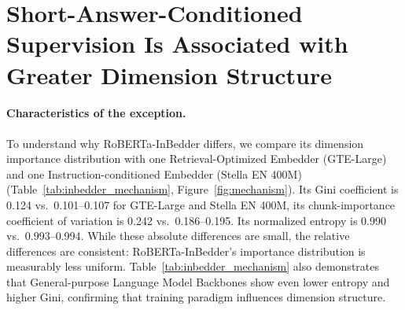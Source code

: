 \documentclass[11pt]{article}
\begin{document}
\begin{table}[t]
    \centering
    \caption{Retrieval cost--quality tradeoff at dim=256 for GTE-Large using FAISS FlatIP. nDCG@10 and Recall report retention relative to the full-dimensional baseline for each task.}
    \label{tab:retrieval_cost}
\end{table}


\section{Short-Answer-Conditioned Supervision Is Associated with Greater Dimension Structure}
\label{sec:Inbedder-mechanism}
\paragraph{Characteristics of the exception.}
To understand why RoBERTa-InBedder differs, we compare its dimension importance distribution with one Retrieval-Optimized Embedder (GTE-Large) and one Instruction-conditioned Embedder (Stella EN 400M) (Table~\ref{tab:inbedder_mechanism}, Figure~\ref{fig:mechanism}). Its Gini coefficient is 0.124 vs.\ 0.101--0.107 for GTE-Large and Stella EN 400M, its chunk-importance coefficient of variation is 0.242 vs.\ 0.186--0.195. Its normalized entropy is 0.990 vs.\ 0.993--0.994. While these absolute differences are small, the relative differences are consistent: RoBERTa-InBedder's importance distribution is measurably less uniform. Table~\ref{tab:inbedder_mechanism} also demonstrates that General-purpose Language Model Backbones show even lower entropy and higher Gini, confirming that training paradigm influences dimension structure.
\end{document}

